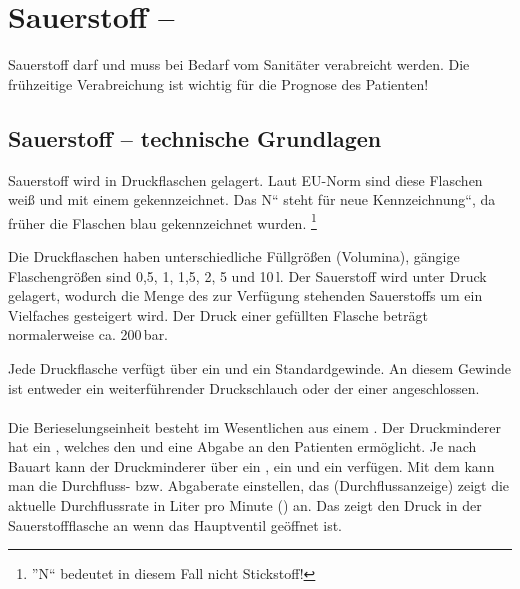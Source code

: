 



\section{Sauerstoff -- }
\label{topic:sauerstoff}\label{topic:o2}


Sauerstoff darf und muss bei Bedarf vom Sanitäter
verabreicht werden. Die frühzeitige Verabreichung ist wichtig für die Prognose des
Patienten!

% 

\subsection{Sauerstoff -- technische Grundlagen}
Sauerstoff wird in Druckflaschen  gelagert. Laut EU-Norm sind diese
Flaschen weiß und mit einem
{\quotedblbase} gekennzeichnet.
Das {\quotedblbase}N{\textquotedblleft} steht für {\quotedblbase}neue Kennzeichnung{\textquotedblleft}, da früher die
Flaschen blau gekennzeichnet wurden. \footnote{{\textquotedblright}N{\textquotedblleft} bedeutet in diesem Fall nicht Stickstoff!}

Die Druckflaschen haben unterschiedliche Füllgrößen (Volumina),
gängige Flaschengrößen sind 0,5, 1, 1,5, 2, 5 und
10\,l. Der Sauerstoff wird unter Druck gelagert, wodurch die
Menge des zur Verfügung stehenden Sauerstoffs um ein Vielfaches
gesteigert wird. Der Druck einer gefüllten Flasche beträgt
normalerweise ca. 200\,bar. 

Jede Druckflasche verfügt über ein  und
ein Standardgewinde. An diesem Gewinde ist entweder ein
weiterführender Druckschlauch oder der 
einer  angeschlossen. 

\paragraph{}
Die
Berieselungseinheit besteht im Wesentlichen aus einem
. Der Druckminderer hat ein
, welches den  und eine Abgabe an den Patienten ermöglicht. Je nach Bauart kann der Druckminderer über ein , ein 
und ein  verfügen. Mit dem
 kann man die Durchfluss- bzw. Abgaberate ein\-stellen, das
 (Durchflussanzeige) zeigt die aktuelle
Durchflussrate in Liter pro Minute (\gLMin) an. Das
 zeigt den Druck in der Sauerstoffflasche an
wenn das Haupt\-ventil geöffnet ist.

